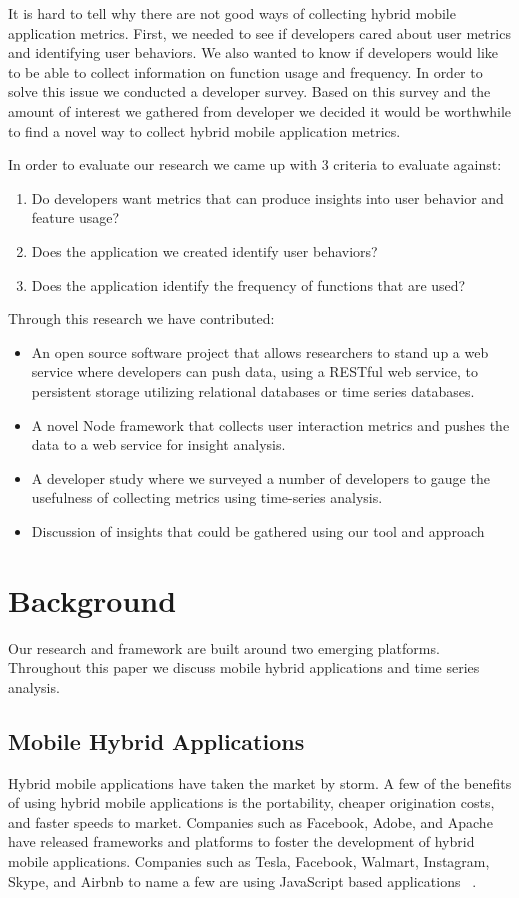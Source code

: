 It is hard to tell why there are not good ways of collecting hybrid mobile application metrics. First, we needed to see if developers cared about user metrics and identifying user behaviors. We also wanted to know if developers would like to be able to collect information on function usage and frequency. In order to solve this issue we conducted a developer survey. Based on this survey and the amount of interest we gathered from developer we decided it would be worthwhile to find a novel way to collect hybrid mobile application metrics.

In order to evaluate our research we came up with 3 criteria to evaluate against: 
\begin{enumerate}
\item Do developers want metrics that can produce insights into user behavior and feature usage?
\item Does the application we created identify user behaviors?
\item Does the application identify the frequency of functions that are used?
\end{enumerate}
Through this research we have contributed:
\begin{itemize}
\item An open source software project that allows researchers to stand up a web service where developers can push data, using a RESTful web service, to persistent storage utilizing relational databases or time series databases.
\item A novel Node framework that collects user interaction metrics and pushes the data to a web service for insight analysis.
\item A developer study where we surveyed a number of developers to  gauge the usefulness of collecting metrics using time-series analysis. 
\item Discussion of insights that could be gathered using our tool and approach
\end{itemize}

\section{Background}
Our research and framework are built around two emerging platforms. Throughout this paper we discuss mobile hybrid applications and time series analysis. 
\subsection{Mobile Hybrid Applications}
Hybrid mobile applications have taken the market by storm.  A few of the benefits of using hybrid mobile applications is the portability, cheaper origination costs, and faster speeds to market. Companies such as Facebook, Adobe, and Apache have released frameworks and platforms to foster the development of hybrid mobile applications. Companies such as Tesla, Facebook, Walmart, Instagram, Skype, and Airbnb to name a few are using JavaScript based applications ~\cite{react-native}. 
